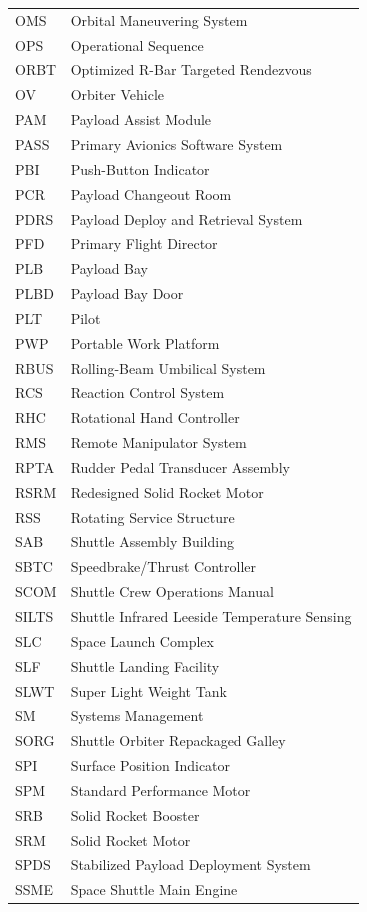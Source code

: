 \documentclass[Space_Shuttle_Vessel_Manual.tex]{subfiles}
\begin{document}
\begin{longtable}{l l }
OMS & Orbital Maneuvering System\\
OPS & Operational Sequence\\
ORBT & Optimized R-Bar Targeted Rendezvous\\
OV & Orbiter Vehicle\\
PAM & Payload Assist Module\\
PASS & Primary Avionics Software System\\
PBI & Push-Button Indicator\\
PCR & Payload Changeout Room\\
PDRS & Payload Deploy and Retrieval System\\
PFD & Primary Flight Director\\
PLB & Payload Bay\\
PLBD & Payload Bay Door\\
PLT & Pilot\\
PWP & Portable Work Platform\\
RBUS & Rolling-Beam Umbilical System\\
RCS & Reaction Control System\\
RHC & Rotational Hand Controller\\
RMS & Remote Manipulator System\\
RPTA & Rudder Pedal Transducer Assembly\\
RSRM & Redesigned Solid Rocket Motor\\
RSS & Rotating Service Structure\\
SAB & Shuttle Assembly Building\\
SBTC & Speedbrake/Thrust Controller\\
SCOM & Shuttle Crew Operations Manual\\
SILTS & Shuttle Infrared Leeside Temperature Sensing\\
SLC & Space Launch Complex\\
SLF & Shuttle Landing Facility\\
SLWT & Super Light Weight Tank\\
SM & Systems Management\\
SORG & Shuttle Orbiter Repackaged Galley\\
SPI & Surface Position Indicator\\
SPM & Standard Performance Motor\\
SRB & Solid Rocket Booster\\
SRM & Solid Rocket Motor\\
SPDS & Stabilized Payload Deployment System\\
SSME & Space Shuttle Main Engine\\

\end{longtable}
\end{document}
